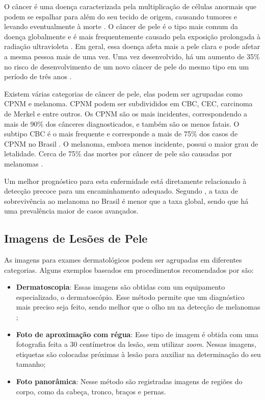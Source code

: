 O câncer é uma doença caracterizada pela multiplicação de células anormais que podem se espalhar para além do seu tecido de origem, causando tumores e levando
eventualmente à morte \cite{cancer}. O câncer de pele é o tipo mais comum da doença globalmente e é mais frequentemente causado pela exposição prolongada à radiação
ultravioleta \cite{skin_cancer}. Em geral, essa doença afeta mais a pele clara e pode afetar a mesma pessoa mais de uma vez. Uma vez desenvolvido, há um aumento de 35\%
no risco de desenvolvimento de um novo câncer de pele do mesmo tipo em um período de três anos \cite{skin_cancer_zink}.

Existem várias categorias de câncer de pele, elas podem ser agrupadas como \ac{CPNM} e melanoma. \ac{CPNM} podem ser subdivididos em \ac{CBC}, \ac{CEC}, carcinoma de
Merkel e entre outros. Os \ac{CPNM} são os mais incidentes, correspondendo a mais de 90\% dos cânceres diagnosticados, e também são os menos fatais. O subtipo \ac{CBC} é o
mais frequente e corresponde a mais de 75\% dos casos de \ac{CPNM} no Brasil \cite{skin_cancer_zink}. O melanoma, embora menos incidente, possui o maior grau de
letalidade. Cerca de 75\% das mortes por câncer de pele são causadas por melanomas \cite{skin_cancer_screening}.

Um melhor prognóstico para esta enfermidade está diretamente relacionado à detecção precoce para um encaminhamento adequado. Segundo \textcite{skin_cancer_survival}, a
taxa de sobrevivência ao melanoma no Brasil é menor que a taxa global, sendo que há uma prevalência maior de casos avançados.

\subsection{Imagens de Lesões de Pele} \label{sec:skin_lesion_images}

As imagens para exames dermatológicos podem ser agrupadas em diferentes categorias. Alguns exemplos baseados em procedimentos recomendados por
\textcite{fotos_dermatologia} são:

\begin{itemize}
      \item \textbf{Dermatoscopia}: Essas imagens são obtidas com um equipamento especializado, o dermatoscópio. Esse método permite que um
            diagnóstico mais preciso seja feito, sendo melhor que o olho nu na detecção de melanomas \cite{dermatoscopy};
      \item \textbf{Foto de aproximação com régua}: Esse tipo de imagem é obtida com uma fotografia feita a 30 centímetros da lesão,
            sem utilizar \textit{zoom}. Nessas imagens, etiquetas são colocadas próximas à lesão para auxiliar na determinação do seu tamanho;
      \item \textbf{Foto panorâmica}: Nesse método são registradas imagens de regiões do corpo, como da cabeça, tronco, braços e pernas.
\end{itemize}

